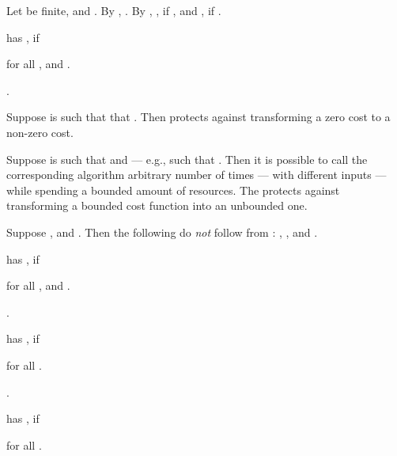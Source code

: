 \documentclass[b5paper, english, oneside]{memoir}
\begin{document}
\begin{example}
Let  be finite, and . By , . By , , if , and , if .
\end{example}

\begin{definition}
 has , if

for all , and .
\end{definition}

\begin{example}
.
\end{example}

\begin{note}
Suppose  is such that that . Then  protects against transforming a zero cost to a non-zero cost.

Suppose  is such that  and  --- e.g.,  such that . Then it is possible to call the corresponding algorithm  arbitrary number of times --- with different inputs --- while spending a bounded amount of resources. The  protects against transforming a bounded cost function into an unbounded one.
\end{note}

\begin{example}
Suppose , and . Then the following do \emph{not} follow from : , , and .
\end{example}

\begin{definition}
 has , if

for all , and .
\end{definition}

\begin{example}
.
\end{example}

\begin{definition}
 has , if

for all .
\end{definition}

\begin{example}
.
\end{example}

\begin{definition}
 has , if

for all .
\end{definition}
\end{document}

